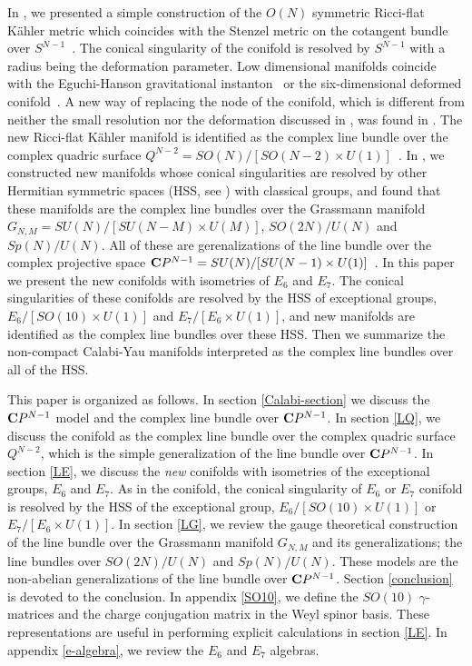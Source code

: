 \documentclass[a4paper,11pt]{article}
\newcommand{\kahler}{K\"{a}hler }
\begin{document}
{In \cite{HKN1},
we presented a simple construction 
of the $O(N)$ symmetric Ricci-flat \kahler metric 
which coincides with the Stenzel metric 
on the cotangent bundle over $S^{N-1}$~\cite{St,CGLP}.
The conical singularity of the conifold is resolved 
by $S^{N-1}$ with a radius being the deformation parameter.
Low dimensional manifolds coincide with 
the Eguchi-Hanson gravitational instanton~\cite{EH}  
or the six-dimensional deformed conifold~\cite{conifold,conifold2}.
A new way of replacing the node of the conifold, 
which is 
different from neither the small resolution 
nor the deformation discussed in 
\cite{conifold,conifold2}, 
was found in \cite{PT,HKN2}.
The new Ricci-flat \kahler manifold is identified 
as the complex line bundle over 
the complex quadric surface 
$Q^{N-2} = SO(N)/[SO(N-2) \times U(1)]$~\cite{HKN2}. 
In \cite{HKN3},
we constructed new manifolds 
whose conical singularities are resolved 
by other Hermitian symmetric spaces (HSS, see \cite{HN1,HN2})
with classical groups, and found that 
these manifolds are the complex line bundles over 
the Grassmann manifold 
$G_{N,M}=SU(N)/[SU(N-M)\times U(M)]$, 
$SO(2N)/U(N)$ and $Sp(N)/U(N)$. 
All of these are gerenalizations of 
the line bundle over 
the complex projective space ${\bf C}P^{N-1}
= SU(N)/[SU(N-1)\times U(1)]$~\cite{Ca}. 
In this paper
we present the new conifolds with isometries of 
$E_6$ and $E_7$.   
The conical singularities of these conifolds 
are resolved by the HSS of exceptional groups,  
$E_6/[SO(10) \times U(1)]$ and
$E_7/[E_6 \times U(1)]$, 
and new manifolds are identified 
as the complex line bundles over 
these HSS.
Then we summarize the non-compact Calabi-Yau manifolds
interpreted as the complex line bundles over all of the HSS.


This paper is organized as follows.
In section \ref{Calabi-section}
we discuss the ${\bf C}P^{N-1}$ model and 
the complex line bundle over ${\bf C}P^{N-1}$. 
In section \ref{LQ},
we discuss the conifold as 
the complex line bundle 
over the complex quadric surface $Q^{N-2}$, 
which is the simple generalization of 
the line bundle over ${\bf C}P^{N-1}$.
In section \ref{LE},
we discuss the {\it new} conifolds 
with isometries of the exceptional groups, 
$E_6$ and $E_7$.
As in the conifold, the conical singularity of 
$E_6$ or $E_7$ conifold 
is resolved by the HSS of the exceptional group, 
$E_6/[SO(10)\times U(1)]$ or $E_7/[E_6\times U(1)]$. 
In section \ref{LG},
we review the gauge theoretical construction of 
the line bundle over the Grassmann manifold $G_{N,M}$ 
and its generalizations;
the line bundles over $SO(2N)/U(N)$ and $Sp(N)/U(N)$.
These models are 
the non-abelian generalizations of 
the line bundle over ${\bf C}P^{N-1}$. 
Section \ref{conclusion} is devoted to the conclusion.
In appendix \ref{SO10},
we define the $SO(10)$ $\gamma$-matrices 
and the charge conjugation matrix 
in the Weyl spinor basis.
These representations are useful in performing explicit calculations 
in section \ref{LE}.
In appendix \ref{e-algebra},
we review the $E_6$ and $E_7$ algebras.

}
\end{document}
